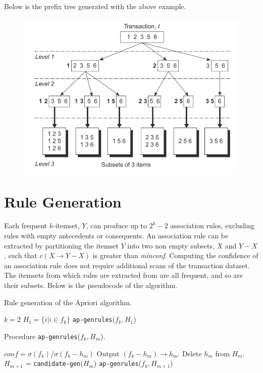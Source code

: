 Below is the prefix tree generated with the above example.

\begin{figure}[h]
    \centering
    \includegraphics[width=0.7\linewidth]{img/apriori_prefixtree.png}   
\end{figure}

\section{Rule Generation}

Each frequent $k$-itemset, $Y$, can produce up to $2^k - 2$ association rules, excluding rules with empty antecedents or consequents. An association rule can be extracted by partitioning the itemset $Y$ into two non empty subsets, $X$ and $Y-X$, such that $c(X \rightarrow Y-X)$ is greater than \textit{minconf}. Computing the confidence of an association rule does not require additional scans of the transaction dataset. The itemsets from which rules are extracted from are all frequent, and so are their subsets. Below is the pseudocode of the algorithm.

\begin{algorithm}[h]
\caption{Rule generation of the Apriori algorithm.}
\begin{algorithmic}[1]
    \State $k = 2$
        \State $H_1 = \{ i | i \in f_k \}$
        \State \texttt{ap-genrules}($f_k, H_1$)
    \EndFor
\end{algorithmic}
\end{algorithm}

\begin{algorithm}[h]
\caption{Procedure \texttt{ap-genrules}($f_k, H_m$).}
\begin{algorithmic}[1]
        $conf = \sigma(f_k) / \sigma(f_k - h_m)$
            \State Output $(f_k - h_m) \rightarrow h_m$.
        \Else{}
            \State Delete $h_m$ from $H_m$.
        \EndIf
    \EndFor
        \State $H_{m+1}$ = \texttt{candidate-gen}($H_m$)
        \State \texttt{ap-genrules}($f_k, H_{m+1}$)
    \EndIf
\end{algorithmic}
\end{algorithm}

